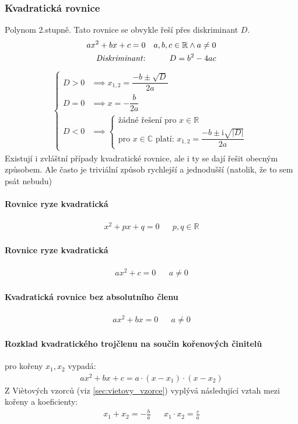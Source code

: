 \documentclass[12pt]{article}
\providecommand{\abs}[1]{\lvert#1\rvert}
\newcommand{\iu}{\mathrm{i}} %
\newcommand{\nR}{\mathbb{R}} %
\newcommand{\nC}{\mathbb{C}} %
\begin{document}
\subsubsection{Kvadratická rovnice}
Polynom 2.stupně. Tato rovnice se obvykle řeší přes diskriminant $D$.
\begin{align}
ax^2 + bx +c = 0 && a,b,c \in \nR \land a \neq 0\\
\text{\emph{Diskriminant}:} && D = b^2 - 4ac
\end{align}
\begin{align}
\begin{cases}
D>0 & \implies x_{1,2} = \dfrac{-b \pm \sqrt{D}}{2a}\\
D=0 & \implies x = - \dfrac{b}{2a}\\
D<0 & \implies \begin{cases}
\text{žádné řešení pro $x\in \nR$}\\
\text{pro $x \in \nC$ platí: } x_{1,2} = \dfrac{-b \pm \iu \sqrt{\abs{D}}}{2a}
\end{cases}
\end{cases}
\end{align}
Existují i zvláštní případy kvadratické rovnice, ale i ty se dají řešit obecným způsobem. Ale často je triviální způsob rychlejší a jednodušší (natolik, že to sem psát nebudu)
\paragraph{Rovnice ryze kvadratická}
\begin{align}
x^2 + px +q = 0 && p,q \in \nR
\end{align}
\paragraph{Rovnice ryze kvadratická}
\begin{align}
ax^2 + c =0 && a\neq 0
\end{align}
\paragraph{Kvadratická rovnice bez absolutního členu}
\begin{align}
ax^2 + bx = 0 && a \neq 0
\end{align}
\paragraph{Rozklad kvadratického trojčlenu na součin kořenových činitelů} pro kořeny $x_1,x_2$ vypadá:
\begin{align}
\label{eq:korenove_cinitele}
ax^2  +bx+c = a \cdot (x-x_1) \cdot (x-x_2)
\end{align}
Z Viètových vzorců (viz \ref{sec:vietovy_vzorce}) vyplývá následující vztah mezi kořeny a koeficienty:
\begin{align}
x_1 + x_2 = - \frac{b}{a} && x_1 \cdot x_2 = \frac{c}{a}
\end{align}
\end{document}
